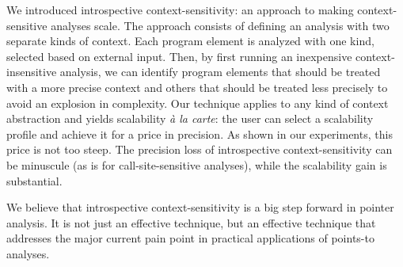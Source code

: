 We introduced introspective context-sensitivity: an approach to making
context-sensitive analyses scale. The approach consists of defining an
analysis with two separate kinds of context. Each program element is
analyzed with one kind, selected based on external input. Then, by
first running an inexpensive context-insensitive analysis, we can
identify program elements that should be treated with a more precise
context and others that should be treated less precisely to avoid an
explosion in complexity. Our technique applies to any kind of context
abstraction and yields scalability \emph{\`{a} la carte}: the user can
select a scalability profile and achieve it for a price in
precision. As shown in our experiments, this price is not too
steep. The precision loss of introspective context-sensitivity can be
minuscule (as is for call-site-sensitive analyses), while the
scalability gain is substantial. 

We believe that introspective context-sensitivity is a big step
forward in pointer analysis. It is not just an effective technique,
but an effective technique that addresses the major current pain point
in practical applications of points-to analyses.



